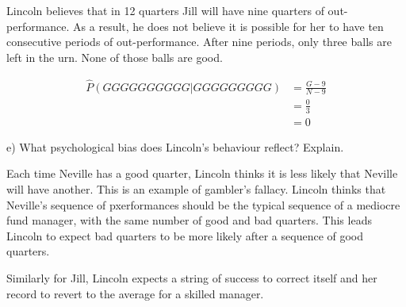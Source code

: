 \documentclass[
  letterpaper,
  DIV=11,
  numbers=noendperiod]{scrreprt}
\begin{document}
\begin{tcolorbox}[enhanced jigsaw, title=\textcolor{quarto-callout-tip-color}{\faLightbulb}\hspace{0.5em}{Answer}, toprule=.15mm, colback=white, breakable, titlerule=0mm, colframe=quarto-callout-tip-color-frame, coltitle=black, opacityback=0, rightrule=.15mm, colbacktitle=quarto-callout-tip-color!10!white, bottomtitle=1mm, opacitybacktitle=0.6, arc=.35mm, bottomrule=.15mm, toptitle=1mm, leftrule=.75mm, left=2mm]

Lincoln believes that in 12 quarters Jill will have nine quarters of
out-performance. As a result, he does not believe it is possible for her
to have ten consecutive periods of out-performance. After nine periods,
only three balls are left in the urn. None of those balls are good.

\begin{align*}
\hat P(GGGGGGGGGG|GGGGGGGGG)&=\frac{G-9}{N-9} \\
&=\frac{0}{3} \\
&=0
\end{align*}

\end{tcolorbox}

e) What psychological bias does Lincoln's behaviour reflect? Explain.

\begin{tcolorbox}[enhanced jigsaw, title=\textcolor{quarto-callout-tip-color}{\faLightbulb}\hspace{0.5em}{Answer}, toprule=.15mm, colback=white, breakable, titlerule=0mm, colframe=quarto-callout-tip-color-frame, coltitle=black, opacityback=0, rightrule=.15mm, colbacktitle=quarto-callout-tip-color!10!white, bottomtitle=1mm, opacitybacktitle=0.6, arc=.35mm, bottomrule=.15mm, toptitle=1mm, leftrule=.75mm, left=2mm]

Each time Neville has a good quarter, Lincoln thinks it is less likely
that Neville will have another. This is an example of gambler's fallacy.
Lincoln thinks that Neville's sequence of pxerformances should be the
typical sequence of a mediocre fund manager, with the same number of
good and bad quarters. This leads Lincoln to expect bad quarters to be
more likely after a sequence of good quarters.

Similarly for Jill, Lincoln expects a string of success to correct
itself and her record to revert to the average for a skilled manager.

\end{tcolorbox}
\end{document}
